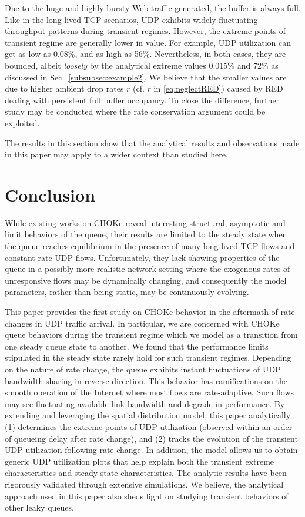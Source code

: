 \documentclass{IEEEtran}
\begin{document}
    Due to the huge and highly bursty  Web traffic generated, the buffer  is always full. Like in the long-lived TCP scenarios, UDP exhibits widely fluctuating throughput patterns during transient regimes. However, the extreme points of transient regime are generally lower in  value. For example, UDP utilization can get as low as 0.08\%, and as high as 56\%. Nevertheless, in both cases, they are bounded, albeit \emph{loosely} by the analytical extreme values 0.015\% and 72\% as discussed in Sec.~\ref{subsubsec:example2}. We believe that the smaller values are due to higher ambient drop rates $r$ (cf. $r$ in \eqref{eq:neglectRED}) caused by RED dealing with persistent full buffer occupancy. To close the difference, further study may be conducted where the rate conservation argument could be exploited.


    The results in this section show that the analytical results and observations made in this paper may apply to a wider context than studied here.

     \section{Conclusion}\label{sec:conclusion}

     While existing works on CHOKe reveal interesting structural, asymptotic and limit behaviors of the queue, their results are limited to the steady state when the queue reaches equilibrium in the presence of many long-lived TCP flows and constant rate UDP flows. Unfortunately, they lack showing properties of the queue in a possibly more realistic network setting where the exogenous rates of unresponsive flows may be dynamically changing, and consequently the model parameters, rather than being static, may be continuously evolving.

     This paper provides the first study on CHOKe behavior in the aftermath of rate changes in UDP traffic arrival. In particular, we are concerned with CHOKe queue behaviors during the transient regime which we model as a transition from one steady queue state to another. We found that the performance limits stipulated in the steady state rarely hold for such transient regimes. Depending on the nature of rate change, the queue exhibits instant fluctuations of UDP bandwidth sharing in reverse direction. This behavior has ramifications on the smooth operation of the Internet where most flows are rate-adaptive. Such flows may see fluctuating available link bandwidth and degrade in performance. By extending and leveraging the spatial distribution model, this paper analytically (1)  determines the extreme points of UDP utilization (observed within an order of queueing delay after rate change), and (2) tracks the  evolution of the transient UDP utilization following rate change. In addition, the model allows us to obtain generic UDP utilization plots that help explain both the transient extreme characteristics and steady-state characteristics. The analytic results have been rigorously validated through extensive simulations. We believe, the analytical approach used in this paper also sheds light on studying transient behaviors of other leaky queues.
\end{document}
